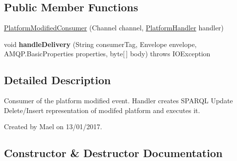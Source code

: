 \subsection*{Public Member Functions}
\begin{DoxyCompactItemize}
\item 
\hyperlink{classeu_1_1h2020_1_1symbiote_1_1communication_1_1PlatformModifiedConsumer_ad9b04b6ba41b1d6280f63f1a458e3348}{Platform\+Modified\+Consumer} (Channel channel, \hyperlink{classeu_1_1h2020_1_1symbiote_1_1handlers_1_1PlatformHandler}{Platform\+Handler} handler)
\item 
void {\bfseries handle\+Delivery} (String consumer\+Tag, Envelope envelope, A\+M\+Q\+P.\+Basic\+Properties properties, byte\mbox{[}$\,$\mbox{]} body)  throws I\+O\+Exception \hypertarget{classeu_1_1h2020_1_1symbiote_1_1communication_1_1PlatformModifiedConsumer_a8e821b65d946c3c63c349507eab2c285}{}\label{classeu_1_1h2020_1_1symbiote_1_1communication_1_1PlatformModifiedConsumer_a8e821b65d946c3c63c349507eab2c285}

\end{DoxyCompactItemize}


\subsection{Detailed Description}
Consumer of the platform modified event. Handler creates S\+P\+A\+R\+QL Update Delete/\+Insert representation of modifed platform and executes it.

Created by Mael on 13/01/2017. 

\subsection{Constructor \& Destructor Documentation}
